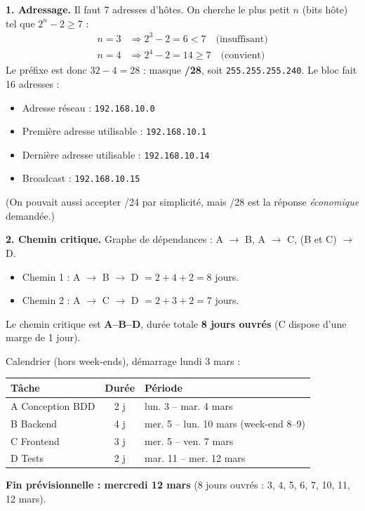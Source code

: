 \documentclass[11pt]{article}
\begin{document}
\begin{corrige}
\textbf{1. Adressage.} Il faut 7 adresses d'hôtes. On cherche le plus petit $n$ (bits hôte) tel que $2^n - 2 \geq 7$ :
\begin{align*}
n=3 &\Rightarrow 2^3-2 = 6 < 7 \quad \text{(insuffisant)}\\
n=4 &\Rightarrow 2^4-2 = 14 \geq 7 \quad \text{(convient)}
\end{align*}
Le préfixe est donc $32-4=28$ : masque \textbf{/28}, soit \texttt{255.255.255.240}. Le bloc fait 16 adresses :
\begin{itemize}
    \item Adresse réseau : \texttt{192.168.10.0}
    \item Première adresse utilisable : \texttt{192.168.10.1}
    \item Dernière adresse utilisable : \texttt{192.168.10.14}
    \item Broadcast : \texttt{192.168.10.15}
\end{itemize}
(On pouvait aussi accepter /24 par simplicité, mais /28 est la réponse \emph{économique} demandée.)

\textbf{2. Chemin critique.} Graphe de dépendances : A $\to$ B, A $\to$ C, (B et C) $\to$ D.
\begin{itemize}
    \item Chemin 1 : A $\to$ B $\to$ D $= 2+4+2 = 8$ jours.
    \item Chemin 2 : A $\to$ C $\to$ D $= 2+3+2 = 7$ jours.
\end{itemize}
Le chemin critique est \textbf{A--B--D}, durée totale \textbf{8 jours ouvrés} (C dispose d'une marge de 1 jour).

Calendrier (hors week-ends), démarrage lundi 3 mars :
\begin{center}
\begin{tabularx}{\linewidth}{|l|c|X|}\hline
\rowcolor{popblueL} \textbf{Tâche} & \textbf{Durée} & \textbf{Période} \\\hline
A Conception BDD & 2 j & lun. 3 -- mar. 4 mars \\\hline
B Backend & 4 j & mer. 5 -- lun. 10 mars (week-end 8--9) \\\hline
C Frontend & 3 j & mer. 5 -- ven. 7 mars \\\hline
D Tests & 2 j & mar. 11 -- mer. 12 mars \\\hline
\end{tabularx}
\end{center}
\textbf{Fin prévisionnelle : mercredi 12 mars} (8 jours ouvrés : 3, 4, 5, 6, 7, 10, 11, 12 mars).
\end{corrige}
\end{document}
